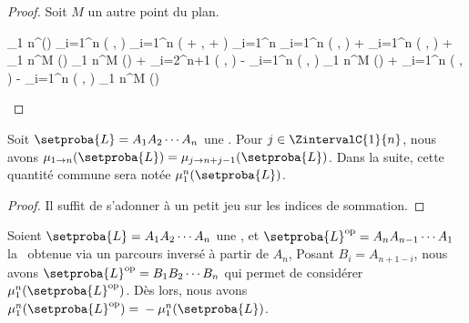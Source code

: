\begin{proof}
	Soit $M$ un autre point du plan.

	\begin{stepcalc}[style=ar*]
		\mu_{1 \to n}^\Omega ()
	\explnext{}
		\dsum_{i=1}^{n} \det \big(  ,  \big)
	\explnext{}
		\dsum_{i=1}^{n} \det \big(  +  ,  +  \big)
	\explnext{}
		\dsum_{i=1}^{n} 
	\explnext{}
		\dsum_{i=1}^{n} \det \big(  ,  \big)
		+
		\dsum_{i=1}^{n} \det \big(  ,  \big)
		+
		\mu_{1 \to n}^M ()
	\explnext{}
		\mu_{1 \to n}^M ()
		+
		\dsum_{i=2}^{n+1} \det \big(  ,  \big)
		-
		\dsum_{i=1}^{n} \det \big(  ,  \big)
		\mu_{1 \to n}^M ()
		+
		\dsum_{i=1}^{n} \det \big(  ,  \big)
		-
		\dsum_{i=1}^{n} \det \big(  ,  \big)
	\explnext{}
		\mu_{1 \to n}^M ()
	\end{stepcalc}
	
	\null\vspace{-3.5ex}
\end{proof}
	
	


\begin{fact} \label{nline-shift-inva}
	Soit $\setproba{L} = A_1 A_2 \cdots A_n$ une \nline.
	Pour $j \in \ZintervalC{1}{n}$, nous avons
	$\mu_{1 \to n} (\setproba{L}) = \mu_{j \to n+j-1} (\setproba{L})$.
	Dans la suite, cette quantité commune sera notée $\mu_1^n (\setproba{L})$.
\end{fact}


\begin{proof}
	Il suffit de s'adonner à un petit jeu sur les indices de sommation.
\end{proof}
	
	


\begin{fact} \label{nline-rota-inva}
	Soient 
	$\setproba{L} = A_1 A_2 \cdots A_n$ une \nline, et 
	$\setproba{L}^{\mathrm{op}} = A_n A_{n-1} \cdots A_1$ la \nline\ obtenue via un parcours inversé à partir de $A_n$, 
	Posant $B_i = A_{n + 1 - i}$, nous avons $\setproba{L}^{\mathrm{op}} = B_1 B_2 \cdots B_n$ qui permet de considérer $\mu_1^n (\setproba{L}^{\mathrm{op}})$.
	Dès lors, nous avons
	$\mu_1^n (\setproba{L}^{\mathrm{op}}) = {} - \mu_1^n (\setproba{L})$.
\end{fact}


